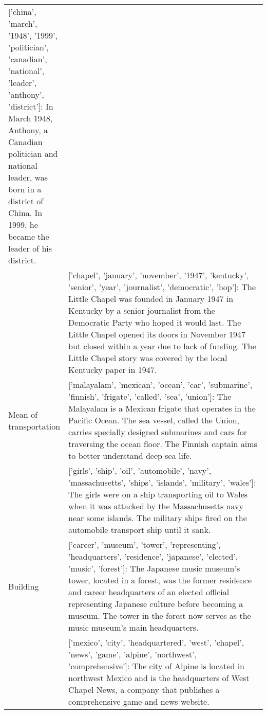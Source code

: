 \begin{table*}
{\begin{centering}
\begin{adjustwidth}{-0.5in}{-0.1in}
\begin{tabular}{p{0.08\linewidth}p{0.92\linewidth}}
['china', 'march', '1948', '1999', 'politician', 'canadian', 'national', 'leader', 'anthony', 'district']: \newline 
\textcolor{goodgreen}{In March 1948, Anthony, a Canadian politician and national leader, was born in a district of China. In 1999, he became the leader of his district.} \\
&
['chapel', 'january', 'november', '1947', 'kentucky', 'senior', 'year', 'journalist', 'democratic', 'hop']: \newline 
\textcolor{badred}{The Little Chapel was founded in January 1947 in Kentucky by a senior journalist from the Democratic Party who hoped it would last. The Little Chapel opened its doors in November 1947 but closed within a year due to lack of funding. The Little Chapel story was covered by the local Kentucky paper in 1947. } \\



\midrule
 Mean of transportation &

['malayalam', 'mexican', 'ocean', 'car', 'submarine', 'finnish', 'frigate', 'called', 'sea', 'union']: \newline 
\textcolor{goodgreen}{The Malayalam is a Mexican frigate that operates in the Pacific Ocean. The sea vessel, called the Union, carries specially designed submarines and cars for traversing the ocean floor. The Finnish captain aims to better understand deep sea life. }\\
&
['girls', 'ship', 'oil', 'automobile', 'navy', 'massachusetts', 'ships', 'islands', 'military', 'wales']: \newline 
\textcolor{badred}{The girls were on a ship transporting oil to Wales when it was attacked by the Massachusetts navy near some islands. The military ships fired on the automobile transport ship until it sank.}
\\



\midrule
 Building
&
['career', 'museum', 'tower', 'representing', 'headquarters', 'residence', 'japanese', 'elected', 'music', 'forest']: \newline 
\textcolor{goodgreen}{The Japanese music museum's tower, located in a forest, was the former residence and career headquarters of an elected official representing Japanese culture before becoming a museum. The tower in the forest now serves as the music museum's main headquarters. }\\
&
['mexico', 'city', 'headquartered', 'west', 'chapel', 'news', 'game', 'alpine', 'northwest', 'comprehensive']: \newline 
\textcolor{badred}{The city of Alpine is located in northwest Mexico and is the headquarters of West Chapel News, a company that publishes a comprehensive game and news website. }\\

\bottomrule
\end{tabular}
\end{adjustwidth}
\end{centering}}
\end{table*}

